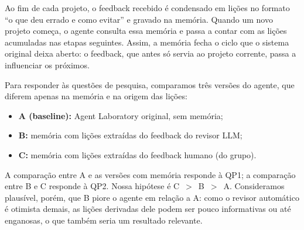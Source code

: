 Ao fim de cada projeto, o feedback recebido é condensado em lições no formato
``o que deu errado e como evitar'' e gravado na memória. Quando um novo
projeto começa, o agente consulta essa memória e passa a contar com as lições
acumuladas nas etapas seguintes. Assim, a memória fecha o ciclo que o sistema
original deixa aberto: o feedback, que antes só servia ao projeto corrente,
passa a influenciar os próximos.

Para responder às questões de pesquisa, comparamos três versões do agente,
que diferem apenas na memória e na origem das lições:
\begin{itemize}
  \item \textbf{A (baseline):} Agent Laboratory original, sem memória;
  \item \textbf{B:} memória com lições extraídas do feedback do revisor LLM;
  \item \textbf{C:} memória com lições extraídas do feedback humano (do grupo).
\end{itemize}
A comparação entre A e as versões com memória responde à QP1; a comparação
entre B e C responde à QP2. Nossa hipótese é C~$>$~B~$>$~A. Consideramos
plausível, porém, que B piore o agente em relação a A: como o revisor
automático é otimista demais, as lições derivadas dele podem ser pouco
informativas ou até enganosas, o que também seria um resultado relevante.




